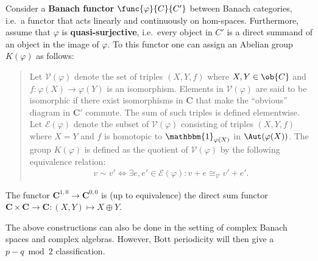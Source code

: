     \begin{construct}\label{clifford:functor_k_group}
        Consider a \textbf{Banach functor} $\func{\varphi}{C}{C'}$ between Banach categories, i.e.~a functor that acts linearly and continuously on hom-spaces. Furthermore, assume that $\varphi$ is \textbf{quasi-surjective}, i.e.~every object in $C'$ is a direct summand of an object in the image of $\varphi$. To this functor one can assign an Abelian group $K(\varphi)$ as follows:
        \begin{quote}
            Let $\mathscr{V}(\varphi)$ denote the set of triples $(X,Y,f)$ where $X,Y\in\ob{C}$ and $f:\varphi(X)\rightarrow\varphi(Y)$ is an isomorphism. Elements in $\mathscr{V}(\varphi)$ are said to be isomorphic if there exist isomorphisms in $\mathbf{C}$ that make the ``obvious'' diagram in $\mathbf{C'}$ commute. The sum of such triples is defined elementwise. Let $\mathscr{E}(\varphi)$ denote the subset of $\mathscr{V}(\varphi)$ consisting of triples $(X,Y,f)$ where $X=Y$ and $f$ is homotopic to $\mathbbm{1}_{\varphi(X)}$ in $\Aut(\varphi(X))$. The group $K(\varphi)$ is defined as the quotient of $\mathscr{V}(\varphi)$ by the following equivalence relation:
            \begin{gather}
                v\sim v'\iff\exists e,e'\in\mathscr{E}(\varphi):v+e\cong_{\mathscr{V}} v'+e'.
            \end{gather}
        \end{quote}
    \end{construct}

    \begin{example}[$K^{0,0}$]\label{clifford:k00}
        The functor $\mathbf{C}^{1,0}\rightarrow\mathbf{C}^{0,0}$ is (up to equivalence) the direct sum functor $\mathbf{C}\times\mathbf{C}\rightarrow\mathbf{C}:(X,Y)\mapsto X\oplus Y$.
    \end{example}

    \begin{remark}\label{clifford:complex_bott_periodicity}
        The above constructions can also be done in the setting of complex Banach spaces and complex algebras. However, Bott periodicity will then give a $p-q\bmod2$ classification.
    \end{remark}

